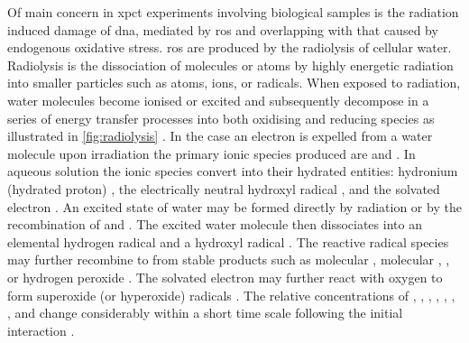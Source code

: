 \documentclass[
twoside,
openright,
titlepage,
numbers=noenddot,
headinclude,
fleqn,
a4paper,
footinclude=true,
cleardoublepage=empty,
abstractoff,
BCOR=5mm,
paper=a4,
fontsize=11pt,
british,ngerman,american,
]{scrreprt}
\begin{document}
Of main concern in \ac{xpct} experiments involving biological samples
is the radiation induced damage of \ac{dna}, mediated by \acf{ros} and
overlapping with that caused by endogenous oxidative stress.  \ac{ros}
are produced by the radiolysis of cellular water.  Radiolysis is the
dissociation of molecules or atoms by highly energetic radiation into
smaller particles such as atoms, ions, or radicals.  When exposed to
radiation, water molecules become ionised or excited and subsequently
decompose in a series of energy transfer processes into both oxidising
and reducing species as illustrated in \cref{fig:radiolysis}
\cite{Gerschman1954a,Gerschman1954b,Hamill1969,Arena1987,LaVerne2000,Wren2010}.
In the case an electron is expelled from a water molecule upon
irradiation the primary ionic species produced are 
and .  In aqueous solution the ionic species
convert into their hydrated entities: hydronium (hydrated proton)
, the electrically neutral hydroxyl radical
, and the solvated electron .  An
excited state of water may be formed directly by radiation or by the
recombination of  and .  The excited
water molecule  then dissociates into an elemental
hydrogen radical  and a hydroxyl radical
.  The reactive radical species may further recombine
to from stable products such as molecular , molecular
, , or hydrogen peroxide .
The solvated electron  may further react with
oxygen to form superoxide (or hyperoxide) radicals .
The relative concentrations of , ,
, , , ,
, and  change considerably
within a short time scale following the initial interaction
\cite{Wren2010}.

\end{document}
